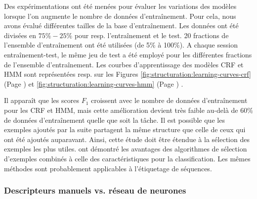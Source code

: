 Des expérimentations ont été menées pour évaluer les variations des modèles lorsque l'on augmente le nombre de données d'entraînement. Pour cela, nous avons évalué différentes tailles de la base d'entraînement. Les données ont été divisées en $75\%-25\%$ pour resp. l'entraînement et le test. 20 fractions de l'ensemble d'entraînement ont été utilisées  (de 5\% à 100\%). A chaque session entraînement-test, le même jeu de test a été employé pour les différentes fractions de l'ensemble d'entraînement. Les courbes d'apprentissage des modèles CRF et HMM sont représentées resp. sur les Figures \ref{fig:structuration:learning-curves-crf} (Page \pageref{fig:structuration:learning-curves-crf}) et \ref{fig:structuration:learning-curves-hmm} (Page \pageref{fig:structuration:learning-curves-hmm}) . 



Il apparaît que les scores $F_1$ croissent avec le nombre de données d'entraînement pour les CRF et HMM, mais cette amélioration devient très faible au-delà de 60\% de données d'entraînement quelle que soit la tâche. Il est possible que les exemples ajoutés par la suite partagent la même structure que celle de ceux qui ont été ajoutés auparavant. Ainsi, cette étude doit être étendue à la sélection des exemples les plus utiles. \citet{raman2003exampleSelection} ont démontré les avantages des algorithmes de sélection d'exemples combinés à celle des caractéristiques pour la classification. Les mêmes méthodes sont probablement applicables à l'étiquetage de séquences.



\subsubsection{Descripteurs manuels vs. réseau de neurones}


